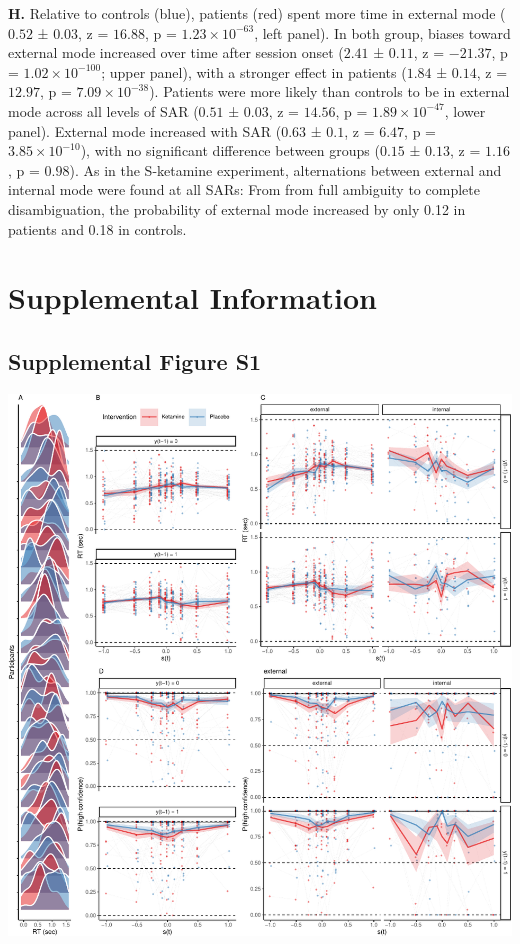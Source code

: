 \documentclass[
]{article}
\begin{document}
\textbf{H.} Relative to controls (blue), patients (red) spent more time
in external mode (\(0.52\) ± \(0.03\), z = \(16.88\), p =
\(\ensuremath{1.23\times 10^{-63}}\), left panel). In both group, biases
toward external mode increased over time after session onset (\(2.41\) ±
\(0.11\), z = \(-21.37\), p = \(\ensuremath{1.02\times 10^{-100}}\);
upper panel), with a stronger effect in patients (\(1.84\) ± \(0.14\), z
= \(12.97\), p = \(\ensuremath{7.09\times 10^{-38}}\)). Patients were
more likely than controls to be in external mode across all levels of
SAR (\(0.51\) ± \(0.03\), z = \(14.56\), p =
\(\ensuremath{1.89\times 10^{-47}}\), lower panel). External mode
increased with SAR (\(0.63\) ± \(0.1\), z = \(6.47\), p =
\(\ensuremath{3.85\times 10^{-10}}\)), with no significant difference
between groups (\(0.15\) ± \(0.13\), z = \(1.16\), p = \(0.98\)). As in
the S-ketamine experiment, alternations between external and internal
mode were found at all SARs: From from full ambiguity to complete
disambiguation, the probability of external mode increased by only 0.12
in patients and 0.18 in controls.

\newpage

\hypertarget{supplemental-information}{%
\section{Supplemental Information}\label{supplemental-information}}

\hypertarget{supplemental-figure-s1}{%
\subsection{Supplemental Figure S1}\label{supplemental-figure-s1}}

\includegraphics{modes_ketamine_scz_files/figure-latex/Supplemental_Figure_S1-1.pdf}
\end{document}
